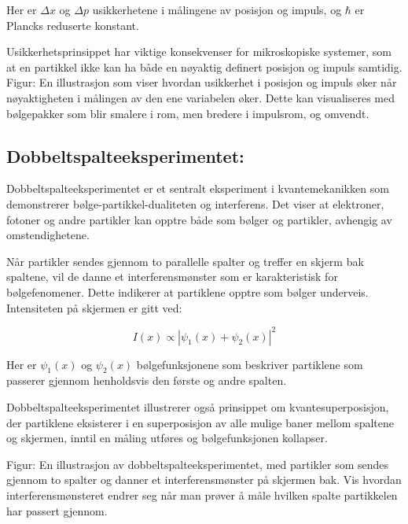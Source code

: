 Her er $\Delta x$ og $\Delta p$ usikkerhetene i målingene av posisjon og impuls, og $\hbar$ er Plancks reduserte konstant.

Usikkerhetsprinsippet har viktige konsekvenser for mikroskopiske systemer, som at en partikkel ikke kan ha både en nøyaktig definert posisjon og impuls samtidig.\\
Figur: En illustrasjon som viser hvordan usikkerhet i posisjon og impuls øker når nøyaktigheten i målingen av den ene variabelen øker. Dette kan visualiseres med bølgepakker som blir smalere i rom, men bredere i impulsrom, og omvendt.

\subsection*{Dobbeltspalteeksperimentet:}
Dobbeltspalteeksperimentet er et sentralt eksperiment i kvantemekanikken som demonstrerer bølge-partikkel-dualiteten og interferens. Det viser at elektroner, fotoner og andre partikler kan opptre både som bølger og partikler, avhengig av omstendighetene.

Når partikler sendes gjennom to parallelle spalter og treffer en skjerm bak spaltene, vil de danne et interferensmønster som er karakteristisk for bølgefenomener. Dette indikerer at partiklene opptre som bølger underveis. Intensiteten på skjermen er gitt ved:

\begin{equation*}
I(x) \propto |\psi_1(x) + \psi_2(x)|^2
\end{equation*}

Her er $\psi_1(x)$ og $\psi_2(x)$ bølgefunksjonene som beskriver partiklene som passerer gjennom henholdsvis den første og andre spalten.

Dobbeltspalteeksperimentet illustrerer også prinsippet om kvantesuperposisjon, der partiklene eksisterer i en superposisjon av alle mulige baner mellom spaltene og skjermen, inntil en måling utføres og bølgefunksjonen kollapser.

Figur: En illustrasjon av dobbeltspalteeksperimentet, med partikler som sendes gjennom to spalter og danner et interferensmønster på skjermen bak. Vis hvordan interferensmønsteret endrer seg når man prøver å måle hvilken spalte partikkelen har passert gjennom.


